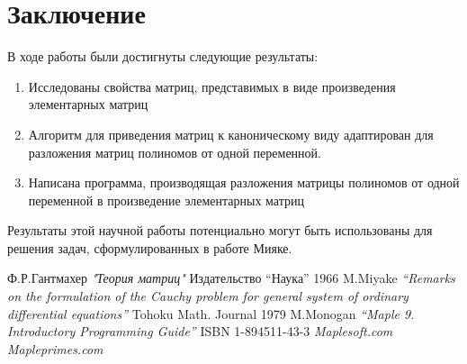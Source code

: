 \documentclass[14pt, a4paper]{extreport}
\begin{document}
\chapter{Заключение}
	В ходе работы были достигнуты следующие результаты:
	\begin{enumerate}
		\item Исследованы свойства матриц, представимых в виде произведения элементарных матриц
		\item Алгоритм для приведения матриц к каноническому виду адаптирован для разложения матриц полиномов от одной переменной.
		\item Написана программа, производящая разложения матрицы полиномов от одной переменной в произведение элементарных матриц
	\end{enumerate}
	Результаты этой научной работы потенциально могут быть использованы
	для решения задач, сформулированных в работе \cite{miyake} Мияке.

\begin{thebibliography}{5}
		Ф.Р.Гантмахер
		\textit{"Теория матриц"}
		Издательство “Наука” 1966
		M.Miyake
		\textit{“Remarks on the formulation of the Cauchy problem
		for general system of ordinary differential equations”}
		Tohoku Math. Journal 1979
		M.Monogan
		\textit{“Maple 9. Introductory Programming Guide”}
		ISBN 1-894511-43-3
		\textit{Maplesoft.com}
		\textit{Mapleprimes.com}
\end{thebibliography}
\end{document}
